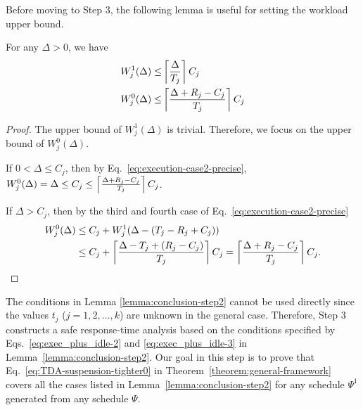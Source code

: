 Before moving to Step 3, the following lemma is useful for setting the workload upper bound.
\begin{Lemma}
  \label{lemma:W_0-and-W_1-upper}
For any $\Delta > 0$, we have
\begin{align}
  W_j^1(\Delta)  \leq &\ceiling{\frac{\Delta}{T_j}}C_j %
  \label{eq:W_1-upper}\\
  W_j^0(\Delta)  \leq &\ceiling{\frac{\Delta+R_j-C_j}{T_j}}C_j %
  \label{eq:W_0-upper}
\end{align}
\end{Lemma}
\begin{proof}
  The upper bound of $W_j^1(\Delta)$ is trivial. Therefore, we focus on the upper bound of $W_j^0(\Delta)$. 
  
  If $0 < \Delta \leq C_j$, then by Eq.~\eqref{eq:execution-case2-precise}, $W_j^0(\Delta) = \Delta \leq C_j \leq \left\lceil{\frac{\Delta+R_j-C_j}{T_j}}\right\rceil C_j$. 
  
  If $\Delta > C_j$, then by the third and fourth case of Eq.~\eqref{eq:execution-case2-precise}
{\footnotesize \begin{align*}
W_j^0(\Delta) &\leq C_j + W_j^1(\Delta - (T_j-R_j+C_j))\nonumber\\
& \leq C_j+\left\lceil{\frac{\Delta-T_j +(R_j-C_j)}{T_j}}\right\rceil C_j  = \left\lceil{\frac{\Delta+R_j-C_j}{T_j}}\right\rceil C_j. 
\end{align*}} %
\end{proof}







The conditions in Lemma \ref{lemma:conclusion-step2}  cannot be used directly since the values $t_j$ ($j=1,2,\ldots,k$)
are unknown in the general case. %
Therefore, Step 3 constructs a safe response-time analysis based on the
conditions specified by Eqs.~\eqref{eq:exec_plus_idle-2} and
\eqref{eq:exec_plus_idle-3} in Lemma~\ref{lemma:conclusion-step2}. Our
goal in this step is to prove that Eq.~\eqref{eq:TDA-suspension-tighter0} in Theorem~\ref{theorem:general-framework} covers all the cases listed
in Lemma~\ref{lemma:conclusion-step2} for any schedule $\Psi^1$ generated from any schedule $\Psi$.

